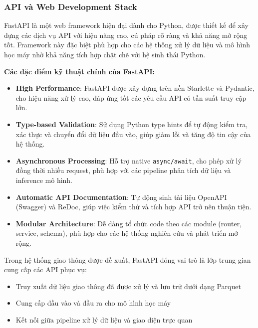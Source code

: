 \subsubsection{API và Web Development Stack}


FastAPI là một web framework hiện đại dành cho Python, được thiết kế để xây dựng các dịch vụ API với hiệu năng cao, cú pháp rõ ràng và khả năng mở rộng tốt. Framework này đặc biệt phù hợp cho các hệ thống xử lý dữ liệu và mô hình học máy nhờ khả năng tích hợp chặt chẽ với hệ sinh thái Python.

\textbf{Các đặc điểm kỹ thuật chính của FastAPI:}

\begin{itemize}
    \item \textbf{High Performance}: FastAPI được xây dựng trên nền Starlette và Pydantic, cho hiệu năng xử lý cao, đáp ứng tốt các yêu cầu API có tần suất truy cập lớn.
    
    \item \textbf{Type-based Validation}: Sử dụng Python type hints để tự động kiểm tra, xác thực và chuyển đổi dữ liệu đầu vào, giúp giảm lỗi và tăng độ tin cậy của hệ thống.
    
    \item \textbf{Asynchronous Processing}: Hỗ trợ native \texttt{async/await}, cho phép xử lý đồng thời nhiều request, phù hợp với các pipeline phân tích dữ liệu và inference mô hình.
    
    \item \textbf{Automatic API Documentation}: Tự động sinh tài liệu OpenAPI (Swagger) và ReDoc, giúp việc kiểm thử và tích hợp API trở nên thuận tiện.
    
    \item \textbf{Modular Architecture}: Dễ dàng tổ chức code theo các module (router, service, schema), phù hợp cho các hệ thống nghiên cứu và phát triển mở rộng.
\end{itemize}

Trong hệ thống giao thông được đề xuất, FastAPI đóng vai trò là lớp trung gian cung cấp các API phục vụ:
\begin{itemize}
    \item Truy xuất dữ liệu giao thông đã được xử lý và lưu trữ dưới dạng Parquet
    \item Cung cấp đầu vào và đầu ra cho mô hình học máy
    \item Kết nối giữa pipeline xử lý dữ liệu và giao diện trực quan
\end{itemize}

